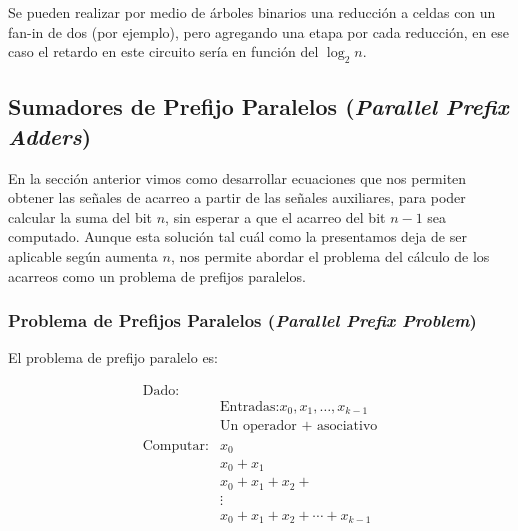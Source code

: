 Se pueden realizar por medio de árboles binarios una reducción a celdas con un fan-in de dos (por ejemplo), pero agregando una etapa por cada reducción, en ese caso el retardo en este circuito sería en función del $\log_2 n$.





\subsection{Sumadores de Prefijo Paralelos (\emph{Parallel Prefix Adders})}
En la sección anterior vimos como desarrollar ecuaciones que nos permiten obtener las señales de acarreo a partir de las señales auxiliares, para poder calcular la suma del bit $n$, sin esperar a que el acarreo del bit $n-1$ sea computado. Aunque esta solución tal cuál como la presentamos deja de ser aplicable según aumenta $n$, nos permite abordar el problema del cálculo de los acarreos como un problema de prefijos paralelos.
\subsubsection{Problema de Prefijos Paralelos (\emph{Parallel Prefix Problem})}
El problema de prefijo paralelo es:

\begin{equation}
\begin{align}
\text{Dado:}\\
 & \text{Entradas:} x_0,x_1,\dotsc,x_{k-1} \\
 & \text{Un operador + asociativo}\\ 
\text{Computar}:&x_0 \nonumber \\
&x_0+x_1 \nonumber \\ 
&x_0+x_1+x_2+ \nonumber \\ 
&\vdots \nonumber \\ 
&x_0+x_1+x_2+\dotsb+x_{k-1} \nonumber
\end{align}
\end{equation}

